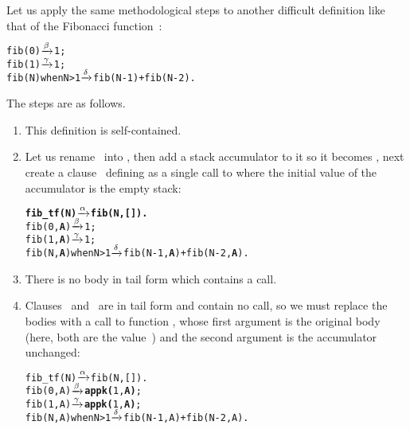 Let us apply the same methodological steps to another difficult
definition like that of the Fibonacci function~:
\begin{alltt}
fib(0)            \(\smashedrightarrow{\beta}\) 1;
fib(1)            \(\smashedrightarrow{\gamma}\) 1;
fib(N) when N > 1 \(\smashedrightarrow{\delta}\) fib(N-1) + fib(N-2).
\end{alltt}
The steps are as follows.
\begin{enumerate}

  \item This definition is self\hyp{}contained.

  \item Let us rename~ into , then add a
    stack accumulator to it so it becomes , next create
    a clause~\clause{\alpha} defining  as a single
    call to  where the initial value of the accumulator
    is the empty stack:
\begin{alltt}
\textbf{fib\_tf(N)           \(\smashedrightarrow{\alpha}\) fib(N,[]).}\hfill% \emph{New}
fib(0,\textbf{A})            \(\smashedrightarrow{\beta}\) 1;
fib(1,\textbf{A})            \(\smashedrightarrow{\gamma}\) 1;
fib(N,\textbf{A}) when N > 1 \(\smashedrightarrow{\delta}\) fib(N-1,\textbf{A}) + fib(N-2,\textbf{A}).
\end{alltt}

  \item There is no body in tail form which contains a call.

  \item Clauses \clause{\beta}~and~\clause{\gamma} are in tail form
    and contain no call, so we must replace the bodies with a call to
    function , whose first argument is the original
    body (here, both are the value~) and the second
    argument is the accumulator unchanged:
\begin{alltt}
fib\_tf(N)           \(\smashedrightarrow{\alpha}\) fib(N,[]).
fib(0,A)            \(\smashedrightarrow{\beta}\) \textbf{appk(}1,\textbf{A)};
fib(1,A)            \(\smashedrightarrow{\gamma}\) \textbf{appk(}1,\textbf{A)};
fib(N,A) when N > 1 \(\smashedrightarrow{\delta}\) fib(N-1,A) + fib(N-2,A).
\end{alltt}


\end{enumerate}
